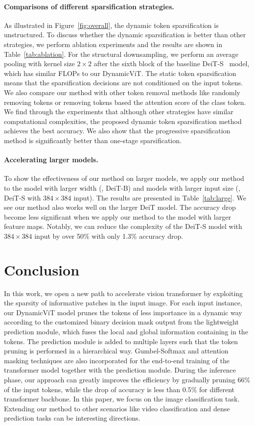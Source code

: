 \documentclass{article}
\begin{document}
\paragraph{Comparisons of different sparsification strategies.} As illustrated in Figure~\ref{fig:overall}, the dynamic token sparsification is unstructured. To discuss whether the dynamic sparsification is better than other strategies, we perform ablation experiments and the results are shown in Table~\ref{tab:ablation}. For the structural downsampling, we perform an average pooling with kernel size $2\times 2$ after the sixth block of the baseline DeiT-S~\cite{touvron2020deit} model, which has similar FLOPs to our DynamicViT. The static token sparsification means that the sparsification decisions are not conditioned on the input tokens. We also compare our method with other token removal methods like randomly removing tokens or removing tokens based the attention score of the class token. We find through the experiments that although other strategies have similar computational complexities, the proposed dynamic token sparsification method achieves the best accuracy. We also show that the progressive sparsification method is significantly better than one-stage sparsification.

\paragraph{Accelerating larger models.} To show the effectiveness of our method on larger models, we apply our method to the model with larger width (\ie, DeiT-B) and models with larger input size (\ie, DeiT-S with $384\times 384$ input). The results are presented in Table~\ref{tab:large}. We see our method also works well on the larger DeiT model. The accuracy drop become less significant when we apply our method to the model with larger feature maps. Notably, we can reduce the complexity of the DeiT-S model with $384\times 384$ input by over 50\% with only 1.3\% accuracy drop.

\section{Conclusion}
\label{sec:con}
In this work, we open a new path to accelerate vision transformer by exploiting the sparsity of informative patches in the input image. For each input instance, our DynamicViT model prunes the tokens of less importance in a dynamic way according to the customized binary decision mask output from the lightweight prediction module, which fuses the local and global information containing in the tokens. The prediction module is added to multiple layers such that the token pruning is performed in a hierarchical way. Gumbel-Softmax and attention masking techniques are also incorporated for the end-to-end training of the transformer model together with the prediction module. During the inference phase, our approach can greatly improves the efficiency by gradually pruning 66\% of the input tokens, while the drop of accuracy is less than 0.5\% for different transformer backbone. In this paper, we focus on the image classification task. Extending our method to other scenarios like video classification and dense prediction tasks can be interesting directions.
\end{document}

